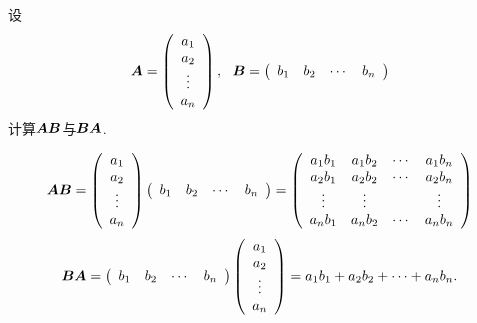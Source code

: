 \begin{li}
  设
  $$
  \boldsymbol{A} = \left(
    \begin{array}{c}
      a_1\\
      a_2\\
      \vdots\\
      a_n
    \end{array}
  \right), ~~
  \boldsymbol{B} = \left(
    \begin{array}{cccc}
      b_1 & b_2 & \cdots & b_n
    \end{array}
  \right)
  $$
  计算$\boldsymbol{A}\boldsymbol{B}$与$\boldsymbol{B}\boldsymbol{A}$.
\end{li}
\begin{jie}
  $$
  \boldsymbol{A}\boldsymbol{B} = \left(
    \begin{array}{c}
      a_1\\
      a_2\\
      \vdots\\
      a_n
    \end{array}
  \right)\left(
    \begin{array}{cccc}
      b_1 & b_2 & \cdots & b_n
    \end{array}
  \right) 
  = \left(
    \begin{array}{cccc}
      a_1b_1 & a_1b_2 & \cdots & a_1b_n\\
      a_2b_1 & a_2b_2 & \cdots & a_2b_n\\
      \vdots & \vdots & & \vdots\\
      a_nb_1 & a_nb_2 & \cdots & a_nb_n
    \end{array}
  \right)
  $$  
  $$
  \boldsymbol{B}\boldsymbol{A} = \left(
    \begin{array}{cccc}
      b_1 & b_2 & \cdots & b_n
    \end{array}
  \right)\left(
    \begin{array}{c}
      a_1\\
      a_2\\
      \vdots\\
      a_n
    \end{array}
  \right)  
  = a_1b_1+a_2b_2+\cdots+a_nb_n.
  $$
\end{jie}

